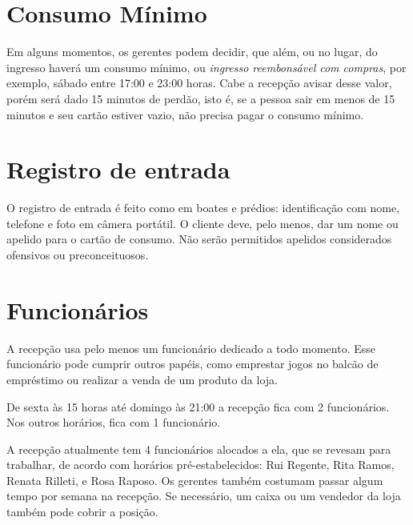 \section{Consumo Mínimo}

Em alguns momentos, os gerentes podem decidir, que além, ou no lugar, do ingresso haverá um consumo mínimo, ou \textit{ingresso reembonsável com compras}, por exemplo, sábado entre 17:00 e 23:00 horas. Cabe a recepção avisar desse valor, porém será dado 15 minutos de perdão, isto é, se a pessoa sair em menos de 15 minutos e seu cartão estiver vazio, não precisa pagar o consumo mínimo.

\section{Registro de entrada}

O registro de entrada é feito como em boates e prédios: identificação com nome, telefone e foto em câmera portátil. O cliente deve, pelo menos, dar um nome ou apelido para o cartão de consumo. Não serão permitidos apelidos considerados ofensivos ou preconceituosos.

\section{Funcionários}

A recepção usa pelo menos um funcionário dedicado a todo momento. Esse funcionário pode cumprir outros papéis, como emprestar jogos no balcão de empréstimo ou realizar a venda de um produto da loja.

De sexta às 15 horas até domingo às 21:00 a recepção fica com 2 funcionários. Nos outros horários, fica com 1 funcionário.

A recepção atualmente tem 4 funcionários alocados a ela, que se revesam para  trabalhar, de acordo com horários pré-estabelecidos: Rui Regente, Rita Ramos, Renata Rilleti, e Rosa Raposo. Os gerentes também costumam passar algum tempo por semana na recepção. Se necessário, um caixa ou um vendedor da loja também pode cobrir a posição. 

